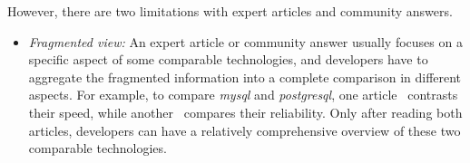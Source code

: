 However, there are two limitations with expert articles and community answers.
\begin{itemize}[leftmargin=*]
	
	\item \textit{Fragmented view:} An expert article or community answer usually focuses on a specific aspect of some comparable technologies, and developers have to aggregate the fragmented information into a complete comparison in different aspects.
	For example, to compare \textit{mysql} and \textit{postgresql}, one article~\cite{web:mysql1} contrasts their speed, while another~\cite{web:mysql2} compares their reliability.
	Only after reading both articles, developers can have a relatively comprehensive overview of these two comparable technologies.
	
	

\end{itemize}
